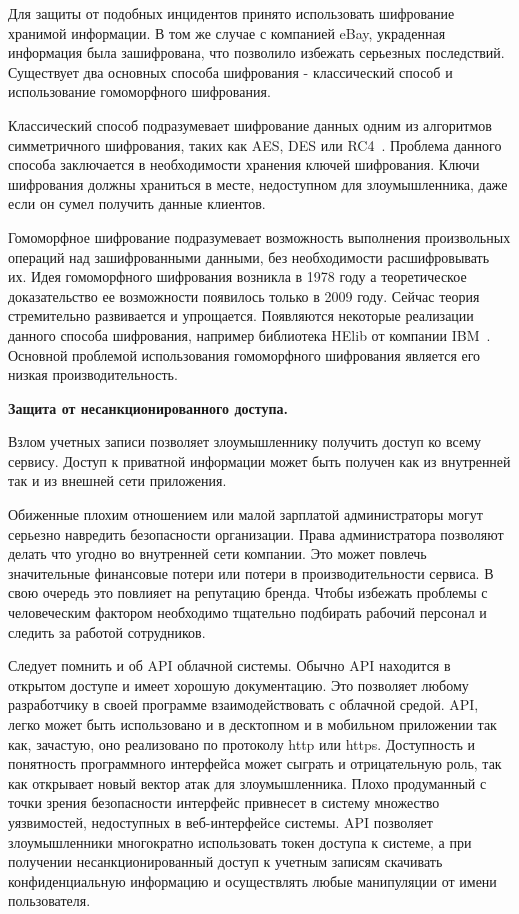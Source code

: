 Для защиты от подобных инцидентов принято использовать шифрование хранимой информации. В том же случае с компанией eBay, украденная информация была зашифрована, что позволило избежать серьезных последствий. Существует два основных способа шифрования - классический способ и использование гомоморфного шифрования. 

Классический способ подразумевает шифрование данных одним из алгоритмов симметричного шифрования, таких как AES, DES или RC4~\cite{sqlSecurity}. Проблема данного способа заключается в необходимости хранения ключей шифрования. Ключи шифрования должны храниться в месте, недоступном для злоумышленника, даже если он сумел получить данные клиентов.

Гомоморфное шифрование подразумевает возможность выполнения произвольных операций над зашифрованными данными, без необходимости расшифровывать их. Идея гомоморфного шифрования возникла в 1978 году а теоретическое доказательство ее возможности появилось только в 2009 году. Сейчас теория стремительно развивается и упрощается. Появляются некоторые реализации данного способа шифрования, например библиотека HElib от компании IBM~\cite{HElib}. Основной проблемой использования гомоморфного шифрования является его низкая производительность.

\textbf{Защита от несанкционированного доступа.}

Взлом учетных записи позволяет злоумышленнику получить доступ ко всему сервису. Доступ к приватной информации может быть получен как из внутренней так и из внешней сети приложения. 

Обиженные плохим отношением или малой зарплатой администраторы могут серьезно навредить безопасности организации. Права администратора позволяют делать что угодно во внутренней сети компании. Это может повлечь значительные финансовые потери или потери в производительности сервиса. В свою очередь это повлияет на репутацию бренда. Чтобы избежать проблемы с человеческим фактором необходимо тщательно подбирать рабочий персонал и следить за работой сотрудников.

Следует помнить и об API облачной системы. Обычно API находится в открытом доступе и имеет хорошую документацию. Это позволяет любому разработчику в своей программе взаимодействовать с облачной средой. API, легко может быть использовано и в десктопном и в мобильном приложении так как, зачастую, оно реализовано по протоколу http или https. Доступность и понятность программного интерфейса может сыграть и отрицательную роль, так как открывает новый вектор атак для злоумышленника. Плохо продуманный с точки зрения безопасности интерфейс привнесет в систему множество уязвимостей, недоступных в веб-интерфейсе системы. API позволяет злоумышленники многократно использовать токен доступа к системе, а при получении несанкционированный доступ к учетным записям скачивать конфиденциальную информацию и осуществлять любые манипуляции от имени пользователя.


